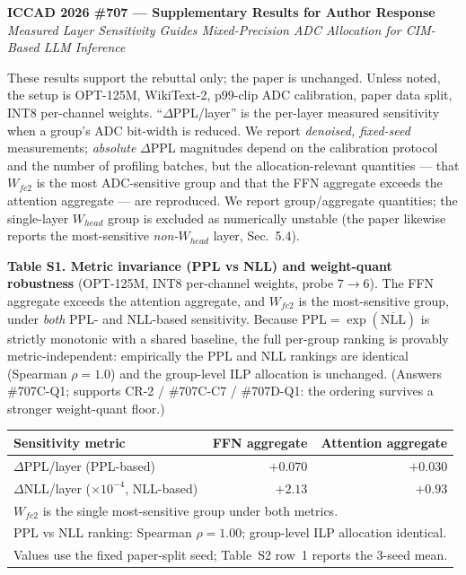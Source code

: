 \documentclass[10pt]{article}
\begin{document}
\begin{center}
{\large\bfseries ICCAD 2026 \#707 --- Supplementary Results for Author Response}\\[2pt]
\emph{Measured Layer Sensitivity Guides Mixed-Precision ADC Allocation for CIM-Based LLM Inference}
\end{center}

\noindent
These results support the rebuttal only; the paper is unchanged. Unless noted,
the setup is OPT-125M, WikiText-2, p99-clip ADC calibration, paper data split,
INT8 per-channel weights. ``$\Delta$PPL/layer'' is the per-layer measured
sensitivity when a group's ADC bit-width is reduced. We report \emph{denoised,
fixed-seed} measurements; \emph{absolute} $\Delta$PPL magnitudes depend on the
calibration protocol and the number of profiling batches, but the allocation-relevant quantities --- that
$W_{fc2}$ is the most ADC-sensitive group and that the FFN aggregate exceeds the
attention aggregate --- are reproduced. We report group/aggregate quantities; the
single-layer $W_{head}$ group is excluded as numerically unstable (the paper likewise reports the most-sensitive
\emph{non-$W_{head}$} layer, Sec.~5.4).

\vspace{1em}
\noindent\textbf{Table S1. Metric invariance (PPL vs NLL) and weight-quant
robustness} (OPT-125M, INT8 per-channel weights, probe $7{\to}6$).
The FFN aggregate exceeds the attention aggregate, and $W_{fc2}$ is the
most-sensitive group, under \emph{both} PPL- and NLL-based sensitivity. Because
$\mathrm{PPL}=\exp(\overline{\mathrm{NLL}})$ is strictly monotonic with a shared
baseline, the full per-group ranking is provably metric-independent: empirically
the PPL and NLL rankings are identical (Spearman $\rho=1.0$) and the group-level
ILP allocation is unchanged. (Answers \#707C-Q1; supports CR-2 / \#707C-C7 / \#707D-Q1: the
ordering survives a stronger weight-quant floor.)

\begin{center}
\begin{tabular}{lrr}
\toprule
Sensitivity metric & FFN aggregate & Attention aggregate \\
\midrule
$\Delta$PPL/layer (PPL-based) & $+0.070$ & $+0.030$ \\
$\Delta$NLL/layer ($\times10^{-4}$, NLL-based) & $+2.13$ & $+0.93$ \\
\midrule
\multicolumn{3}{l}{$W_{fc2}$ is the single most-sensitive group under both metrics.}\\
\multicolumn{3}{l}{PPL vs NLL ranking: Spearman $\rho=1.00$; group-level ILP allocation identical.}\\
\multicolumn{3}{l}{Values use the fixed paper-split seed; Table~S2 row~1 reports the 3-seed mean.}\\
\bottomrule
\end{tabular}
\end{center}
\end{document}
